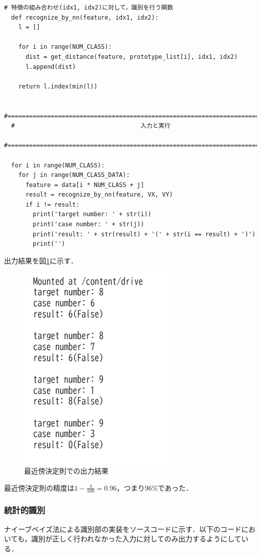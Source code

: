 \documentclass{jlreq}
\numberwithin{equation}{section}
\begin{document}
\begin{lstlisting}[caption={最近傍決定則での識別部の実装}, label=src:nearest]
  # 特徴の組み合わせ(idx1, idx2)に対して，識別を行う関数
  def recognize_by_nn(feature, idx1, idx2):
    l = []
  
    for i in range(NUM_CLASS):
      dist = get_distance(feature, prototype_list[i], idx1, idx2)
      l.append(dist)
  
    return l.index(min(l))
  
  #===============================================================================
  #                                   入力と実行
  #===============================================================================
  
  for i in range(NUM_CLASS):
    for j in range(NUM_CLASS_DATA):
      feature = data[i * NUM_CLASS + j]
      result = recognize_by_nn(feature, VX, VY)
      if i != result:
        print('target number: ' + str(i))
        print('case number: ' + str(j))
        print('result: ' + str(result) + '(' + str(i == result) + ')')
        print('')
\end{lstlisting}

出力結果を図\ref{fig:result_nearest}に示す．
\begin{figure}[H]
  \centering
  \includegraphics{image/nearest_result.png}
  \caption{最近傍決定則での出力結果}
  \label{fig:result_nearest}
\end{figure}

最近傍決定則の精度は$1 - \frac{4}{100} = 0.96$，つまり$96\si{\percent}$であった．

\subsubsection*{統計的識別}
ナイーブベイズ法による識別部の実装をソースコードに示す．以下のコードにおいても，識別が正しく行われなかった入力に対してのみ出力するようにしている．
\end{document}
